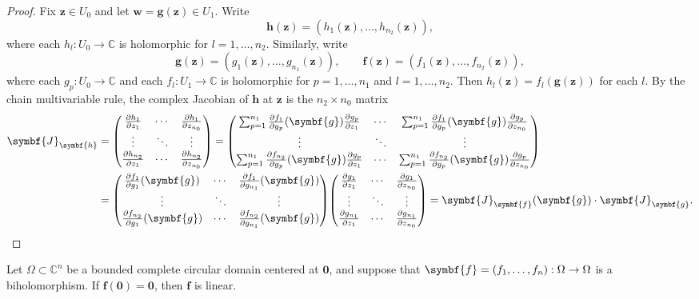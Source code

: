 \begin{proof}
    Fix \(\symbf{z}\in U_0\) and let \(\symbf{w}=\symbf{g}(\symbf{z})\in U_1\). Write \[\symbf{h}(\symbf{z})=(h_1(\symbf{z}),\dots,h_{n_2}(\symbf{z})),\] where each \(h_l:U_0\to\mathbb{C}\) is holomorphic for \(l=1,\dots,n_2\). Similarly, write \[\symbf{g}(\symbf{z})=(g_1(\symbf{z}),\dots,g_{n_1}(\symbf{z})),\qquad\symbf{f}(\symbf{z})=(f_1(\symbf{z}),\dots,f_{n_2}(\symbf{z})),\] where each \(g_p:U_0\to\mathbb{C}\) and each \(f_l:U_1\to\mathbb{C}\) is holomorphic for \(p=1,\dots,n_1\) and \(l=1,\dots,n_2\). Then \(h_l(\symbf{z})=f_l(\symbf{g}(\symbf{z}))\) for each \(l\). By the chain multivariable rule, the complex Jacobian of \(\symbf{h}\) at \(\symbf{z}\) is the \(n_2\times n_0\) matrix
    \begin{align*}
        \symbf{J}_{\symbf{h}}      & =\mqty(\pdv{h_1}{z_1}             & \cdots             & \pdv{h_1}{z_{n_0}}             \\\vdots&\ddots&\vdots\\\pdv{h_{n_2}}{z_1}&\cdots&\pdv{h_{n_2}}{z_{n_0}})=\mqty(\sum_{p=1}^{n_1}\pdv{f_1}{g_p}\qty(\symbf{g})\pdv{g_p}{z_1}&\cdots&\sum_{p=1}^{n_1}\pdv{f_1}{g_p}\qty(\symbf{g})\pdv{g_p}{z_{n_0}}\\\vdots&\ddots&\vdots\\\sum_{p=1}^{n_1}\pdv{f_{n_2}}{g_p}\qty(\symbf{g})\pdv{g_p}{z_1}&\cdots&\sum_{p=1}^{n_1}\pdv{f_{n_2}}{g_p}\qty(\symbf{g})\pdv{g_p}{z_{n_0}})\\
                             & =\mqty(\pdv{f_1}{g_1}\qty(\symbf{g}) & \cdots             & \pdv{f_1}{g_{n_1}}\qty(\symbf{g}) \\\vdots&\ddots&\vdots\\\pdv{f_{n_2}}{g_1}\qty(\symbf{g}) & \cdots & \pdv{f_{n_2}}{g_{n_1}}\qty(\symbf{g}))
        \mqty(\pdv{g_1}{z_1} & \cdots                            & \pdv{g_1}{z_{n_0}}                                  \\\vdots&\ddots&\vdots\\\pdv{g_{n_1}}{z_1}&\cdots&\pdv{g_{n_1}}{z_{n_0}})=\symbf{J}_{\symbf{f}}(\symbf{g})\cdot\symbf{J}_{\symbf{g}}.\qedhere
    \end{align*}
\end{proof}
\begin{lemma}[Cartan]\label{lem:multivarcartan2}
    Let \(\Omega\subset\mathbb{C}^n\) be a bounded complete circular domain centered at \(\symbf{0}\), and suppose that \(\symbf{f}=\qty(f_1,\ldots,f_n):\Omega\to\Omega\) is a biholomorphism. If \(\symbf{f}(\symbf{0})=\symbf{0}\), then \(\symbf{f}\) is linear.
\end{lemma}
